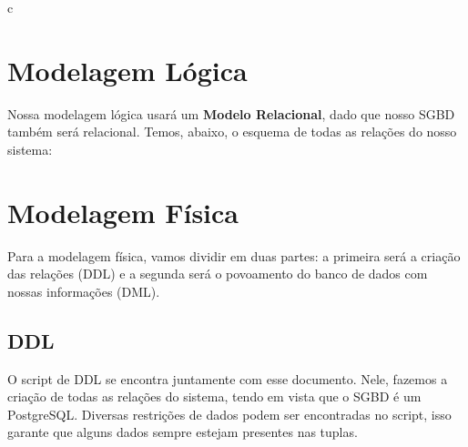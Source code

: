 c\documentclass{article}
\begin{document}
\section{Modelagem Lógica}
	Nossa modelagem lógica usará um \textbf{Modelo Relacional}, dado que nosso SGBD também será relacional. Temos, abaixo, o esquema de todas as relações do nosso sistema:\\


\section{Modelagem Física}
	Para a modelagem física, vamos dividir em duas partes: a primeira será a criação das relações (DDL) e a segunda será o povoamento do banco de dados com nossas informações (DML).
	\subsection{DDL}
		O script de DDL se encontra juntamente com esse documento. Nele, fazemos a criação de todas as relações do sistema, tendo em vista que o SGBD é um PostgreSQL. Diversas restrições de dados podem ser encontradas no script, isso garante que alguns dados sempre estejam presentes nas tuplas.
		
\end{document}
